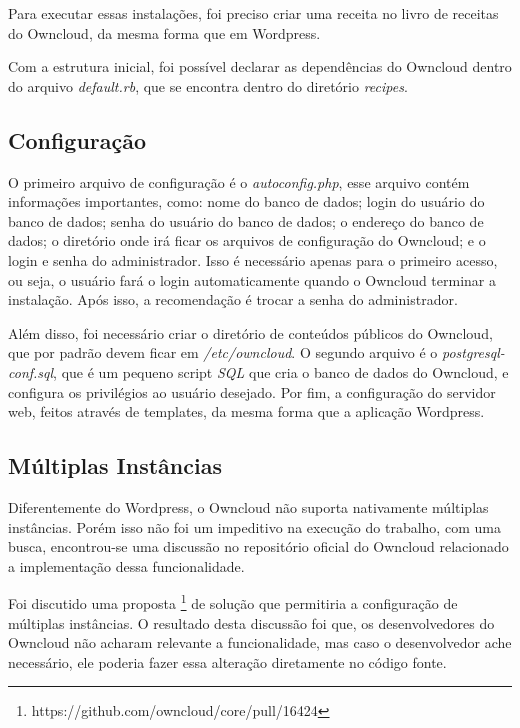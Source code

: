 Para executar essas instalações, foi preciso criar uma receita no livro de receitas
do Owncloud, da mesma forma que em Wordpress.

Com a estrutura inicial, foi possível declarar as dependências do Owncloud
dentro do arquivo \textit{default.rb}, que se encontra dentro do diretório 
\textit{recipes}.
 
\subsection{Configuração}

O primeiro arquivo de configuração é o \textit{autoconfig.php}, esse arquivo
contém informações importantes, como: nome do banco de dados;
login do usuário do banco de dados; senha do usuário do banco de dados; o endereço 
do banco de dados; o diretório
onde irá ficar os arquivos de configuração do Owncloud; e o login e senha
do administrador. Isso é necessário apenas para o primeiro acesso, ou seja, o usuário
fará o login automaticamente quando o Owncloud terminar a instalação. Após isso,
a recomendação é trocar a senha do administrador.

Além disso, foi necessário criar o diretório de conteúdos públicos do Owncloud, que por
padrão devem ficar em \textit{/etc/owncloud}. O segundo arquivo é o 
\textit{postgresql-conf.sql}, que é um pequeno script \textit{SQL} que cria o 
banco de dados do Owncloud, e configura os
privilégios ao usuário desejado. Por fim, a configuração do servidor web, feitos
através de templates, da mesma forma que a aplicação Wordpress.

\subsection{Múltiplas Instâncias}

Diferentemente do Wordpress, o Owncloud não suporta nativamente múltiplas instâncias. 
Porém isso não foi um impeditivo na execução do trabalho, com uma busca, encontrou-se uma 
discussão no repositório oficial do Owncloud relacionado a implementação dessa 
funcionalidade. 

Foi discutido uma proposta \footnote{https://github.com/owncloud/core/pull/16424} 
de solução que permitiria a configuração de múltiplas instâncias. O
resultado desta discussão foi que, os desenvolvedores do Owncloud não acharam relevante
a funcionalidade, mas caso o desenvolvedor ache necessário, ele poderia fazer essa
alteração diretamente no código fonte.

